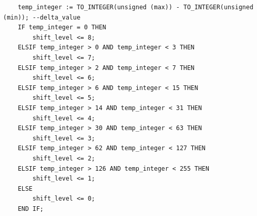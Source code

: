 \documentclass{article}
\begin{document}
\begin{verbatim}
    temp_integer := TO_INTEGER(unsigned (max)) - TO_INTEGER(unsigned (min)); --delta_value
    IF temp_integer = 0 THEN
        shift_level <= 8;
    ELSIF temp_integer > 0 AND temp_integer < 3 THEN
        shift_level <= 7;
    ELSIF temp_integer > 2 AND temp_integer < 7 THEN
        shift_level <= 6;
    ELSIF temp_integer > 6 AND temp_integer < 15 THEN
        shift_level <= 5;
    ELSIF temp_integer > 14 AND temp_integer < 31 THEN
        shift_level <= 4;
    ELSIF temp_integer > 30 AND temp_integer < 63 THEN
        shift_level <= 3;
    ELSIF temp_integer > 62 AND temp_integer < 127 THEN
        shift_level <= 2;
    ELSIF temp_integer > 126 AND temp_integer < 255 THEN
        shift_level <= 1;
    ELSE
        shift_level <= 0;
    END IF;
\end{verbatim}

\vspace{2.5cm}
\end{document}
